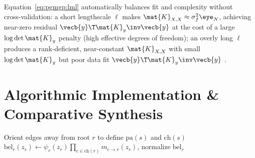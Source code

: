 \documentclass[../../../../master.tex]{subfiles}
\begin{document}
\begin{intuition}
Equation~\eqref{eq:pgmgp:lml} automatically balances fit and complexity without cross-validation: a short lengthscale $\ell$ makes $\mat{K}_{X,X} \approx \sigma_f^2 \eye_N$, achieving near-zero residual $\vecb{y}\T\mat{K}_y\inv\vecb{y}$ at the cost of a large $\log\det\mat{K}_y$ penalty (high effective degrees of freedom); an overly long $\ell$ produces a rank-deficient, near-constant $\mat{K}_{X,X}$ with small $\log\det\mat{K}_y$ but poor data fit $\vecb{y}\T\mat{K}_y\inv\vecb{y}$ .
\end{intuition}

\section{Algorithmic Implementation \& Comparative Synthesis}
\label{sec:pgmgp:algorithms}

\begin{algorithm}[htbp]
\caption{Tree Sum-Product Belief Propagation (Collect--Distribute)}
\label{alg:pgmgp:tree_bp}
Orient edges away from root $r$ to define $\mathrm{pa}(s)$ and $\mathrm{ch}(s)$\;
$\mathrm{bel}_r(z_r) \gets \psi_r(z_r) \prod_{c \in \mathrm{ch}(r)} m_{c \to r}(z_r)$, normalize $\mathrm{bel}_r$\;
\end{algorithm}
\end{document}

